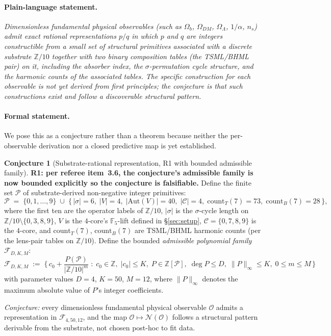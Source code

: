 \documentclass[11pt,reqno]{amsart}
\theoremstyle{plain}
\theoremstyle{definition}
\newtheorem{conjecture}[theorem]{Conjecture}
\theoremstyle{remark}
\newcommand{\Z}{\mathbb{Z}}
\newcommand{\F}{\mathbb{F}}
\newcommand{\Aut}{\mathrm{Aut}}
\begin{document}
\paragraph{Plain-language statement.}
\emph{Dimensionless fundamental physical observables (such as
$\Omega_b$, $\Omega_{DM}$, $\Omega_\Lambda$, $1/\alpha$, $n_s$)
admit exact rational representations $p/q$ in which $p$ and $q$
are integers constructible from a small set of structural
primitives associated with a discrete substrate
$\Z/10$ together with two binary composition tables (the
TSML/BHML pair) on it, including the absorber index, the
$\sigma$-permutation cycle structure, and the harmonic counts
of the associated tables. The specific construction for each
observable is not yet derived from first principles; the
conjecture is that such constructions exist and follow a
discoverable structural pattern.}

\paragraph{Formal statement.}
We pose this as a conjecture rather than a theorem because
neither the per-observable derivation nor a closed predictive
map is yet established.

\begin{conjecture}[Substrate-rational representation, R1 with bounded admissible family]\label{conj:op-obs}
\textbf{R1: per referee item~3.6, the conjecture's admissible
family is now bounded explicitly so the conjecture is falsifiable.}
Define the finite set $\mathcal{P}$ of substrate-derived
non-negative integer primitives:
\[
  \mathcal{P} \;=\;
    \{0, 1, \dots, 9\}
    \;\cup\;
    \{\,|\sigma| = 6,\; |V| = 4,\; |\Aut(V)| = 40,\;
    |\mathcal{C}| = 4,\; \mathrm{count}_{T}(7) = 73,\;
    \mathrm{count}_{B}(7) = 28\,\},
\]
where the first ten are the operator labels of $\Z/10$,
$|\sigma|$ is the $\sigma$-cycle length on
$\Z/10\setminus\{0,3,8,9\}$, $V$ is the $4$-core's
$\F_5$-lift defined in \S\ref{sec:setup},
$\mathcal{C} = \{0,7,8,9\}$ is the $4$-core, and
$\mathrm{count}_{T}(7)$, $\mathrm{count}_{B}(7)$ are
TSML/BHML harmonic counts (per the lens-pair tables on $\Z/10$).
Define the bounded \emph{admissible polynomial family} $\mathcal F_{D, K, M}$:
\[
\mathcal F_{D, K, M} \;:=\; \biggl\{\, c_0 + \frac{P(\mathcal{P})}{|\Z/10|^{m}}
\;:\; c_0 \in \Z,\; |c_0| \le K,\; P \in \Z[\mathcal{P}],\;
\deg P \le D,\; \|P\|_\infty \le K,\; 0 \le m \le M \,\biggr\}
\]
with parameter values $D = 4$, $K = 50$, $M = 12$, where $\|P\|_\infty$
denotes the maximum absolute value of $P$'s integer coefficients.

\emph{Conjecture:} every dimensionless fundamental physical observable
$\mathcal{O}$ admits a representation in $\mathcal F_{4, 50, 12}$, and
the map $\mathcal{O} \mapsto \mathcal{N}(\mathcal{O})$ follows a
structural pattern derivable from the substrate, not chosen post-hoc
to fit data.
\end{conjecture}
\end{document}
